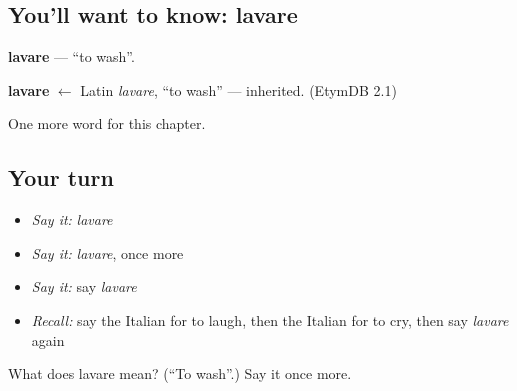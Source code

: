\subsection*{You'll want to know: lavare}
\textbf{lavare} — \textquotedblleft{}to wash\textquotedblright{}.

\begin{cousinweb}
\textbf{lavare} $\leftarrow$ Latin \emph{lavare}, \textquotedblleft{}to wash\textquotedblright{} — inherited. (EtymDB 2.1)
\end{cousinweb}

\begin{grammarlens}[title={What you've built}]
One more word for this chapter.
\end{grammarlens}

\subsection*{Your turn}
\begin{itemize}
\raggedright
  \item \emph{Say it:} \emph{lavare}
  \item \emph{Say it:} \emph{lavare}, once more
  \item \emph{Say it:} say \emph{lavare}
  \item \emph{Recall:} say the Italian for to laugh, then the Italian for to cry, then say \emph{lavare} again
\end{itemize}

\begin{tcolorbox}[breakable,colback=teal!4,colframe=teal!35!black,title={Before you move on}]
What does lavare mean? (\textquotedblleft{}To wash\textquotedblright{}.) Say it once more.
\end{tcolorbox}
